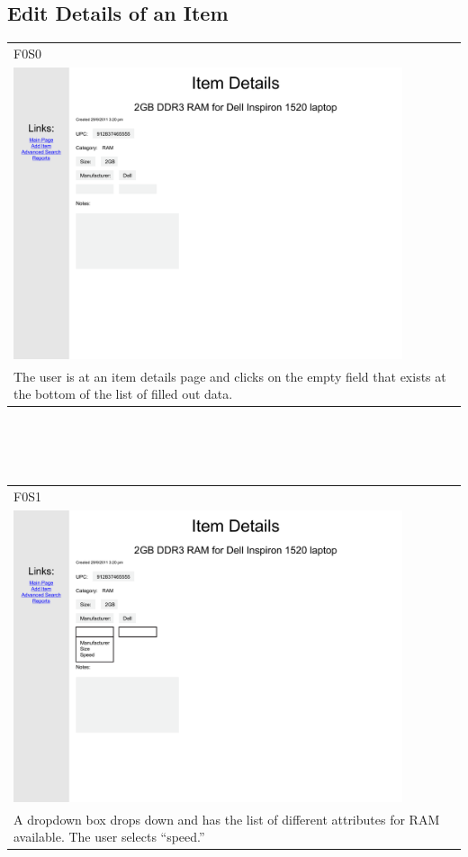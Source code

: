 \documentclass{article}
\begin{document}
\subsection{Edit Details of an Item}
\begin{tabular}{ p{4.5in} }
F0S0\\
\includegraphics[keepaspectratio, width=4.5in]{modifyDetailsF0S0.pdf} \\
The user is at an item details page and clicks on the empty field that exists at the bottom of the list of filled out data.
\end{tabular}\\
~\\
~\\
\begin{tabular}{ p{4.5in} }
F0S1\\
\includegraphics[keepaspectratio, width=4.5in]{modifyDetailsF0S1.pdf} \\
A dropdown box drops down and has the list of different attributes for RAM available. The user selects ``speed.''
\end{tabular}\\
\end{document}
